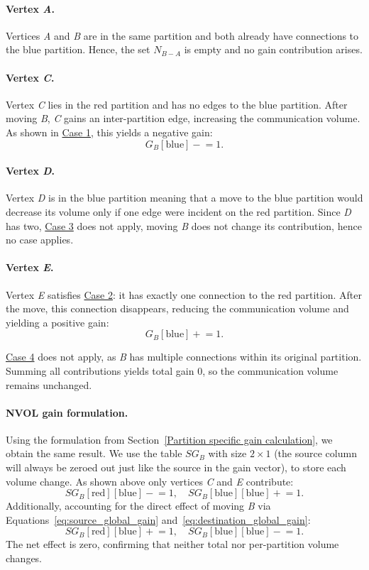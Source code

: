 \paragraph{Vertex \textit{A}.}
Vertices \textit{A} and \textit{B} are in the same partition and both already have connections to the blue partition. Hence, the set $N_{B-A}$ is empty and no gain contribution arises.

\paragraph{Vertex \textit{C}.}
Vertex \textit{C} lies in the red partition and has no edges to the blue partition. After moving \textit{B}, \textit{C} gains an inter-partition edge, increasing the communication volume. As shown in \hyperlink{METIS_case_1}{Case 1}, this yields a negative gain:
\[
G_B[\text{blue}] \mathrel{-}= 1.
\]
\paragraph{Vertex \textit{D}.}
Vertex \textit{D} is in the blue partition meaning that a move to the blue partition would decrease its volume only if one edge were incident on the red partition. Since \textit{D} has two, \hyperlink{METIS_case_3}{Case 3} does not apply, moving \textit{B} does not change its contribution, hence no case applies.

\paragraph{Vertex \textit{E}.}
Vertex \textit{E} satisfies \hyperlink{METIS_case_2}{Case 2}: it has exactly one connection to the red partition. After the move, this connection disappears, reducing the communication volume and yielding a positive gain:
\[
G_B[\text{blue}] \mathrel{+}= 1.
\]

\hyperlink{METIS_case_4}{Case 4} does not apply, as \textit{B} has multiple connections within its original partition. Summing all contributions yields total gain $0$, so the communication volume remains unchanged.

\paragraph{NVOL gain formulation.}
Using the formulation from Section~\ref{Partition specific gain calculation}, we obtain the same result. We use the table $SG_B$ with size $2\times 1$ (the source column will always be zeroed out just like the source in the gain vector), to store each volume change. As shown above only vertices \textit{C} and \textit{E} contribute:
\[
SG_B[\text{red}][\text{blue}] \mathrel{-}= 1, \quad
SG_B[\text{blue}][\text{blue}] \mathrel{+}= 1.
\]
Additionally, accounting for the direct effect of moving \textit{B} via Equations~\ref{eq:source_global_gain} and~\ref{eq:destination_global_gain}:
\[
SG_B[\text{red}][\text{blue}] \mathrel{+}= 1, \quad
SG_B[\text{blue}][\text{blue}] \mathrel{-}= 1.
\]
The net effect is zero, confirming that neither total nor per-partition volume changes.
